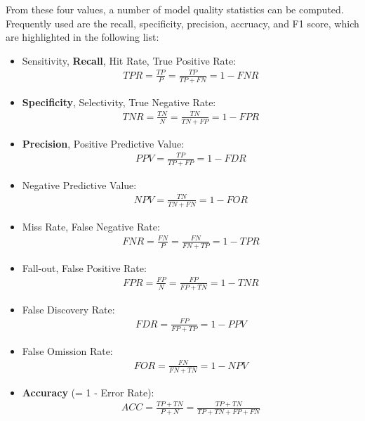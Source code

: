 From these four values, a number of model quality statistics can be computed. Frequently used are the recall, specificity, precision, accruacy, and F1 score, which are highlighted in the following list:

\begin{itemize}
   \item Sensitivity, \textbf{Recall}, Hit Rate, True Positive Rate:
\begin{align*}
TPR = \frac{TP}{P} = \frac{TP}{TP+FN} = 1 - FNR
\end{align*}
   \item \textbf{Specificity}, Selectivity, True Negative Rate:
\begin{align*}
TNR = \frac{TN}{N} = \frac{TN}{TN+FP} = 1 - FPR
\end{align*}
   \item \textbf{Precision}, Positive Predictive Value:
\begin{align*}
PPV = \frac{TP}{TP+FP} = 1 - FDR
\end{align*}
   \item Negative Predictive Value:
\begin{align*}
NPV = \frac{TN}{TN+FN} = 1 - FOR
\end{align*}
   \item Miss Rate, False Negative Rate:
\begin{align*}
FNR = \frac{FN}{P} = \frac{FN}{FN + TP} = 1 - TPR
\end{align*}
   \item Fall-out, False Positive Rate:
\begin{align*}
FPR = \frac{FP}{N} = \frac{FP}{FP+TN} = 1 - TNR
\end{align*}
   \item False Discovery Rate:
\begin{align*}
FDR = \frac{FP}{FP+TP} = 1 - PPV
\end{align*}
   \item False Omission Rate:
\begin{align*}
FOR = \frac{FN}{FN+TN} = 1 - NPV
\end{align*}
   \item \textbf{Accuracy} (= 1 - Error Rate):
\begin{align*}
ACC = \frac{TP+TN}{P+N} = \frac{TP + TN}{TP + TN + FP + FN}
\end{align*}

\end{itemize}
